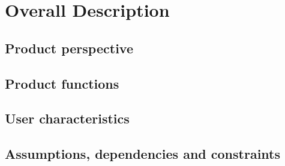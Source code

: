 \section{Overall Description}
\subsection{Product perspective}
\subsection{Product functions}
\subsection{User characteristics}
\subsection{Assumptions, dependencies and constraints}